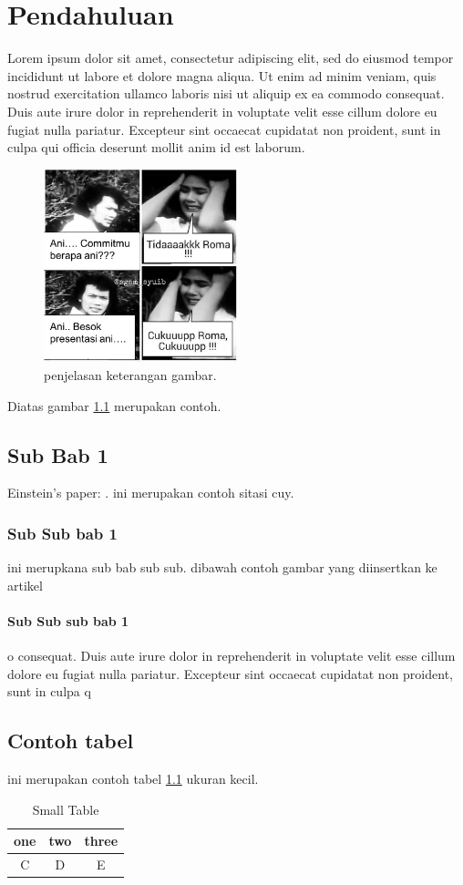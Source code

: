 \chapter{Pendahuluan}

Lorem ipsum dolor sit amet, consectetur adipiscing elit, sed do eiusmod tempor incididunt ut labore et dolore magna aliqua. Ut enim ad minim veniam, quis nostrud exercitation ullamco laboris nisi ut aliquip ex ea commodo consequat. Duis aute irure dolor in reprehenderit in voluptate velit esse cillum dolore eu fugiat nulla pariatur. Excepteur sint occaecat cupidatat non proident, sunt in culpa qui officia deserunt mollit anim id est laborum.
\begin{figure}[ht]
	\centerline{\includegraphics[width=0.5\textwidth]{figures/commitroma.png}}
	\caption{penjelasan keterangan gambar.}
	\label{figure:labelgambar}
	\end{figure}
Diatas gambar \ref{figure:labelgambar} merupakan contoh.
\section{Sub Bab 1}
Einstein's paper: \cite{Einstein}. ini merupakan contoh sitasi cuy.
\subsection{Sub Sub bab 1}
ini merupkana sub bab sub sub. dibawah contoh gambar yang diinsertkan ke artikel
\subsubsection{Sub Sub sub bab 1}
o consequat. Duis aute irure dolor in reprehenderit in voluptate velit esse cillum dolore eu fugiat nulla pariatur. Excepteur sint occaecat cupidatat non proident, sunt in culpa q
\section{Contoh tabel}
ini merupakan contoh tabel \ref{table:contoh} ukuran kecil.
\begin{table}[h]
\caption{Small Table}
\centering
\begin{tabular}{ccc}
\hline
one&two&three\\
\hline
C&D&E\\
\hline
\end{tabular}
\label{table:contoh}
\end{table}
